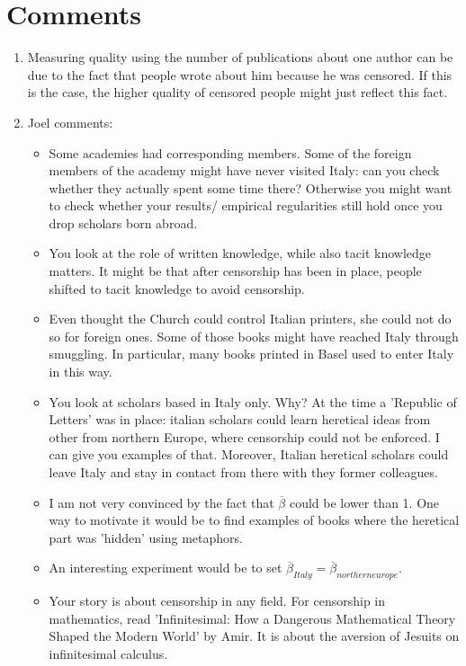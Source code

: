 \documentclass[12pt]{article}
\begin{document}
\section{Comments}
\begin{enumerate}
\item Measuring quality using the number of publications about one author can be due to the fact that people wrote about him because he was censored. If this is the case, the higher quality of censored people might just reflect this fact.
\item Joel comments:

\begin{itemize}

	

\item Some academies had corresponding members. Some of the foreign members of the academy might have never visited Italy: can you check whether they actually spent some time there? Otherwise you might want to check whether your results/ empirical regularities still hold once you drop scholars born abroad.
\item You look at the role of written knowledge, while also tacit knowledge matters. It might be that after censorship has been in place, people shifted to tacit knowledge to avoid censorship.
\item Even thought the Church could control Italian printers, she could not do so for foreign ones. Some of those books might have reached Italy through smuggling. In particular, many books printed in Basel used to enter Italy in this way.
\item You look at scholars based in Italy only. Why? At the time a 'Republic of Letters' was in place: italian scholars could learn heretical ideas from other from northern Europe, where censorship could not be enforced. I can give you examples of that. Moreover, Italian heretical scholars could leave Italy and stay in contact from there with they former colleagues.
\item I am not very convinced by the fact that $ \overline{\beta}$ could be lower than 1. One way to motivate it would be to find examples of books where the heretical part was 'hidden' using metaphors.
\item An interesting experiment would be to set $ \overline{\beta}_{Italy}=\overline{\beta}_{northern europe}$.
\item Your story is about censorship in any field. For censorship in mathematics, read 'Infinitesimal: How a Dangerous Mathematical Theory Shaped the Modern World' by Amir. It is about the aversion of Jesuits on infinitesimal calculus.

\end{itemize}
\end{enumerate}
\end{document}

